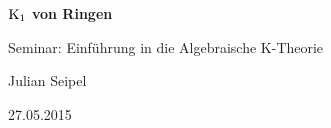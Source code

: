 \documentclass[paper=a4, twoside=false, twocolumn=false, ngerman, fontsize=10pt, titlepage=false, parskip=half, abstract=false,toc=listof]{scrartcl}
\begin{document}


\begin{titlepage}
  \begin{center}
  \centerline{\textbf{\Huge $\operatorname{K_1}$ von Ringen}}
  \vspace{1em}                    
  \centerline{\Large Seminar: Einführung in die Algebraische K-Theorie}
  \vspace{1em}
  \centerline{\Large Julian Seipel}
  \vspace{0.5cm}
  \centerline{27.05.2015}
  \vspace{2cm}
\end{center}
\end{titlepage}




\tableofcontents








\end{document}
